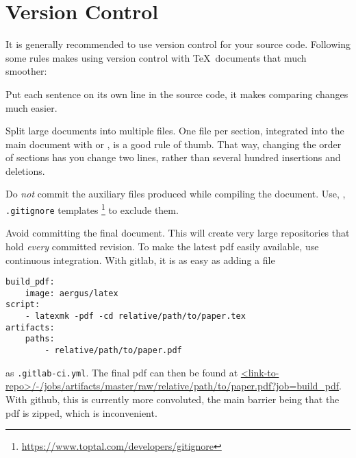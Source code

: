 \section{Version Control}\label{sec:versioncontrol}
It is generally recommended to use version control for your source code.
Following some rules makes using version control with \TeX\ documents that much smoother:

Put each sentence on its own line in the source code, it makes comparing changes much easier.

Split large documents into multiple files.
One file per section, integrated into the main document with \verb|| or \verb||, is a good rule of thumb.
That way, changing the order of sections has you change two lines, rather than several hundred insertions and deletions.

Do \emph{not} commit the auxiliary files produced while compiling the document.
Use, \eg, \verb|.gitignore| templates%
\footnote{\url{https://www.toptal.com/developers/gitignore}}
to exclude them.

Avoid committing the final document.
This will create very large repositories that hold \emph{every} committed revision.
To make the latest pdf easily available, use continuous integration.
With gitlab, it is as easy as adding a file
\begin{Verbatim}[tabsize=4]
build_pdf:
	image: aergus/latex
script:
	- latexmk -pdf -cd relative/path/to/paper.tex
artifacts:
	paths:
		- relative/path/to/paper.pdf
\end{Verbatim}
as \verb|.gitlab-ci.yml|.
The final pdf can then be found at \url{<link-to-repo>/-/jobs/artifacts/master/raw/relative/path/to/paper.pdf?job=build_pdf}.
With github, this is currently more convoluted, the main barrier being that the pdf is zipped, which is inconvenient.
